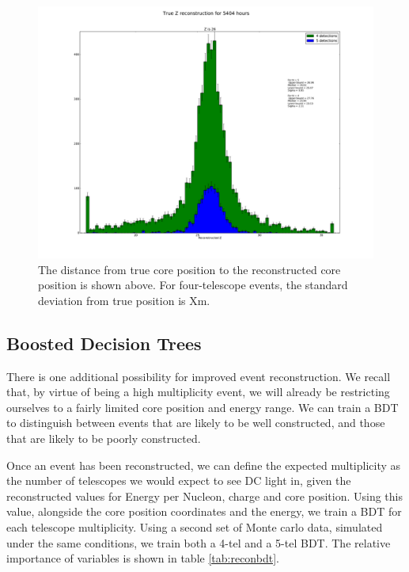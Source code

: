 \documentclass[11pt]{article}
\begin{document}
\begin{figure}
\begin{center}
\includegraphics[width=\textwidth]{rawZ}
\caption{The distance from true core position to the reconstructed core position is shown above. For four-telescope events, the standard deviation from true position is Xm.}
\label{fig:rawZ}
\end{center}
\end{figure} 

\subsection{Boosted Decision Trees}
There is one additional possibility for improved event reconstruction. We recall that, by virtue of being a high multiplicity event, we will already be restricting ourselves to a fairly limited core position and energy range. We can train a BDT to distinguish between events that are likely to be well constructed, and those that are likely to be poorly constructed. 

Once an event has been reconstructed, we can define the expected multiplicity as the number of telescopes we would expect to see DC light in, given the reconstructed values for Energy per Nucleon, charge and core position. Using this value, alongside the core position coordinates and the energy, we train a BDT for each telescope multiplicity. Using a second set of Monte carlo data, simulated under the same conditions, we train both a 4-tel and a 5-tel BDT. The relative importance of variables is shown in table \ref{tab:reconbdt}.
\end{document}
